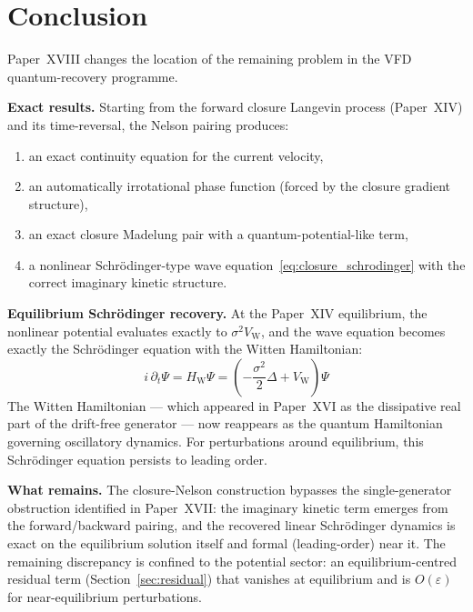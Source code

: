 \documentclass[12pt]{article}
\newcommand{\VW}{V_{\mathrm{W}}}
\begin{document}
\section{Conclusion}\label{sec:conclusion}

Paper~XVIII changes the location of the remaining problem in the VFD quantum-recovery programme.

\textbf{Exact results.} Starting from the forward closure Langevin process (Paper~XIV) and its time-reversal, the Nelson pairing produces:
\begin{enumerate}
    \item an exact continuity equation for the current velocity,
    \item an automatically irrotational phase function (forced by the closure gradient structure),
    \item an exact closure Madelung pair with a quantum-potential-like term,
    \item a nonlinear Schr\"odinger-type wave equation~\eqref{eq:closure_schrodinger} with the correct imaginary kinetic structure.
\end{enumerate}

\textbf{Equilibrium Schr\"odinger recovery.} At the Paper~XIV equilibrium, the nonlinear potential evaluates exactly to $\sigma^2\VW$, and the wave equation becomes exactly the Schr\"odinger equation with the Witten Hamiltonian:
\begin{equation}
    i\,\partial_t\Psi = H_{\mathrm{W}}\Psi = \left(-\frac{\sigma^2}{2}\Delta + \VW\right)\Psi
\end{equation}
The Witten Hamiltonian --- which appeared in Paper~XVI as the dissipative real part of the drift-free generator --- now reappears as the quantum Hamiltonian governing oscillatory dynamics. For perturbations around equilibrium, this Schr\"odinger equation persists to leading order.

\textbf{What remains.} The closure-Nelson construction bypasses the single-generator obstruction identified in Paper~XVII: the imaginary kinetic term emerges from the forward/backward pairing, and the recovered linear Schr\"odinger dynamics is exact on the equilibrium solution itself and formal (leading-order) near it. The remaining discrepancy is confined to the potential sector: an equilibrium-centred residual term (Section~\ref{sec:residual}) that vanishes at equilibrium and is $O(\varepsilon)$ for near-equilibrium perturbations.
\end{document}
